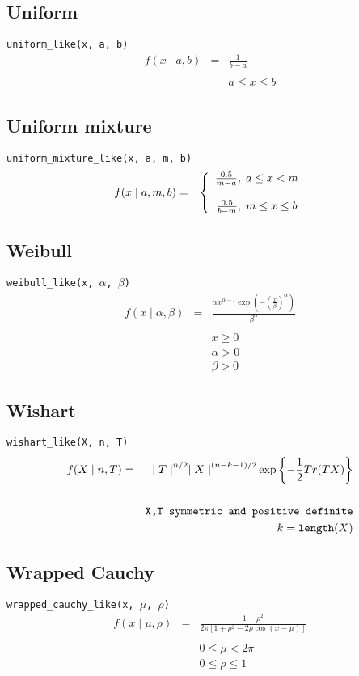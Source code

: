 \subsection*{Uniform}
\verb=uniform_like(x, a, b)=
\begin{eqnarray*}
f(x \mid a, b) &=& \frac{1}{b-a}\\
\\
&& a \le x \le b
\end{eqnarray*}

\subsection*{Uniform mixture}
\verb=uniform_mixture_like(x, a, m, b)=
\begin{eqnarray*}
f(x \mid a, m, b) &=& \left\{\begin{array}{c}\frac{0.5}{m-a}, \hspace{0.1cm} a \le x < m \\
\\
\frac{0.5}{b-m}, \hspace{0.1cm}m \le x \le b \end{array}\right.
\end{eqnarray*}

\subsection*{Weibull}
\verb=weibull_like(x, =$\alpha$\verb=, =$\beta$\verb=)=
\begin{eqnarray*}
f(x \mid \alpha, \beta) &=& \frac{\alpha x^{\alpha - 1} \exp(-(\frac{x}{\beta})^{\alpha})}{\beta^\alpha} \\
\\
&& x \ge 0 \\
&& \alpha > 0 \\
&& \beta > 0
\end{eqnarray*}

\subsection*{Wishart}
\verb=wishart_like(X, n, T)=
\begin{eqnarray*}
f(X \mid n, T) &=& {\mid T \mid}^{n/2}{\mid X \mid}^{(n-k-1)/2} \exp\left\{ -\frac{1}{2} Tr(TX) \right\}\\
\\
&& \verb=X,T symmetric and positive definite= \\
&& k = \verb=length=(X)
\end{eqnarray*}

\subsection*{Wrapped Cauchy}
\verb=wrapped_cauchy_like(x, =$\mu$\verb=, =$\rho$\verb=)=
\begin{eqnarray*}
f(x \mid \mu, \rho) &=& \frac{1-\rho^2}{2\pi [1 + \rho^2 - 2\rho\cos(x-\mu)]} \\
\\
&& 0 \le \mu < 2\pi \\
&& 0 \le \rho \le 1
\end{eqnarray*}
